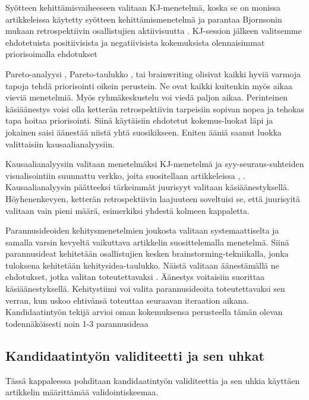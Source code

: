 Syötteen kehittämisvaiheeseen valitaan KJ-menetelmä, koska se on monissa artikkeleissa käytetty syötteen kehittämismenetelmä ja parantaa Bj{o}rnsonin mukaan retrospektiivin osallistujien aktiivisuutta \citep{Bjornson2009}. KJ-session jälkeen valitsemme ehdotetuista positiivisista ja negatiivisista kokemuksista olennaisimmat priorisoimalla ehdotukset

Pareto-analyysi \citep{staalhane2004root}, Pareto-taulukko \citep{card1998learning}, \citep{kalinowski2012evidence} tai brainwriting \citep{Lehtinen2011} olisivat kaikki hyviä varmoja tapoja tehdä priorisointi oikein perustein. Ne ovat kaikki kuitenkin myös aikaa vieviä menetelmiä. Myös ryhmäkeskustelu \citep{staalhane2003post} voi viedä paljon aikaa. Perinteinen käsiäänestys voisi olla ketterän retrospektiivin tarpeisiin sopivan nopea ja tehokas tapa hoitaa priorisointi. Siinä käytäisiin ehdotetut kokemus-luokat läpi ja jokainen saisi äänestää niistä yhtä suosikikseen. Eniten ääniä saanut luokka valittaisiin kausaalianalyysiin.

Kausaalianalyysiin valitaan menetelmäksi KJ-menetelmä ja syy-seuraus-suhteiden visualisointiin suunnattu verkko, joita suositellaan artikkeleissa \citep{Lehtinen2011}, \citep{Bjornson2009}. Kausaalianalyysin päätteeksi tärkeimmät juurisyyt valitaan käsiäänestyksellä. Höyhenenkevyen, ketterän retrospektiivin laajuuteen soveltuisi se, että juurisyitä valitaan vain pieni määrä, esimerkiksi yhdestä kolmeen kappaletta.

Parannusideoiden kehitysmenetelmien joukosta valitaan systemaattiselta ja samalla varsin kevyeltä vaikuttava artikkelin \citep{staalhane2004root} suosittelemalla menetelmä. Siinä parannusideat kehitetään osallistujien kesken brainstorming-tekniikalla, jonka tuloksena kehitetään kehitysidea-taulukko. Näistä valitaan äänestämällä ne ehdotukset, jotka valitan toteutettavaksi \citep{staalhane2004root}. Äänestys voitaisiin suorittaa käsiäänestyksellä. Kehitystiimi voi valita parannusideoita toteutettavaksi sen verran, kun uskoo ehtivänsä toteuttaa seuraavan iteraation aikana. Kandidaatintyön tekijä arvioi oman kokemuksensa perusteella tämän olevan todennäköisesti noin 1-3 parannusideaa

\subsection{Kandidaatintyön validiteetti ja sen uhkat}

Tässä kappaleessa pohditaan kandidaatintyön validiteettia ja sen uhkia käyttäen artikkelin \citep{runeson2009guidelines} määrittämää validointiskeemaa.

